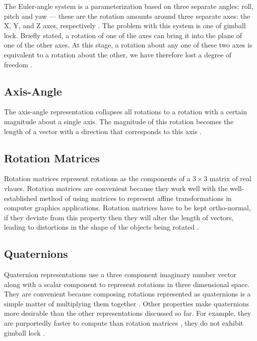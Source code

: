 \documentclass{acm_proc_article-sp}
\begin{document}
The Euler-angle system is a parameterization based on three separate angles: roll, pitch and yaw --- these are the rotation amounts around three separate axes: the X, Y, and Z axes, respectively \parencite[11]{diebel06}.
The problem with this system is one of gimball lock.
Briefly stated, a rotation of one of the axes can bring it into the plane of one of the other axes.
At this stage, a rotation about any one of these two axes is equivalent to a rotation about the other, we have therefore lost a degree of freedom \parencite[4]{pletinckx89}.

\subsection{Axis-Angle}

The axis-angle representation collapses all rotations to a rotation with a certain magnitude about a single axis.
The magnitude of this rotation becomes the length of a vector with a direction that corresponds to this axis \parencite[18]{diebel06}.

\subsection{Rotation Matrices}

Rotation matrices represent rotations as the components of a $3 \times 3$ matrix of real vlaues.
Rotation matrices are convenient because they work well with the well-established method of using matrices to represent affine transformations in computer graphics applications.
Rotation matrices have to be kept ortho-normal, if they deviate from this property then they will alter the length of vectors, leading to distortions in the shape of the objects being rotated \parencite[4--5]{diebel06}.

\subsection{Quaternions}

Quaternion representations use a three component imaginary number vector along with a scalar component to represent rotations in three dimensional space.
They are convenient because composing rotations represented as quaternions is a simple matter of multiplying them together \parencite[246]{schoemake85}.
Other properties make quaternions more desirable than the other representations discussed so far.
For example, they are purportedly faster to compute than rotation matrices \parencite[435]{taylor79}, they do not exhibit gimball lock \parencite[247]{schoemake85}.
\end{document}
